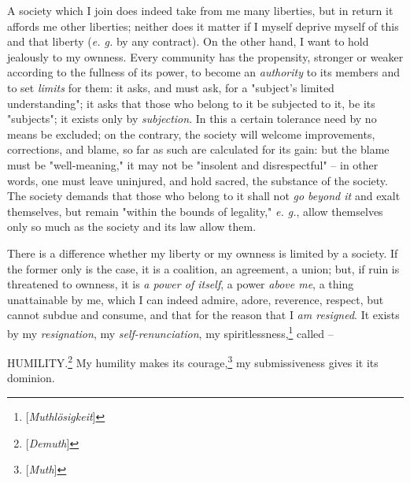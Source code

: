 \documentclass[a4paper]{book}
\begin{document}
A society which I join does indeed take from me many liberties, but in return 
it affords me other liberties; neither does it matter if I myself deprive 
myself of this and that liberty (\textit{e. g.} by any contract). On the other 
hand, I want to hold jealously to my ownness. Every community has the 
propensity, stronger or weaker according to the fullness of its power, to 
become an \textit{authority} to its members and to set \textit{limits} for 
them: it asks, and must ask, for a "{}subject's limited understanding"{}; it 
asks that those who belong to it be subjected to it, be its "{}subjects"{}; it 
exists only by \textit{subjection}. In this a certain tolerance need by no 
means be excluded; on the contrary, the society will welcome improvements, 
corrections, and blame, so far as such are calculated for its gain: but the 
blame must be "{}well-meaning,"{} it may not be "{}insolent and 
disrespectful"{} -- in other words, one must leave uninjured, and hold sacred, 
the substance of the society. The society demands that those who belong to it 
shall not \textit{go beyond it} and exalt themselves, but remain "{}within the 
bounds of legality,"{} \textit{e. g.}, allow themselves only so much as the 
society and its law allow them.

There is a difference whether my liberty or my ownness is limited by a 
society. If the former only is the case, it is a coalition, an agreement, a 
union; but, if ruin is threatened to ownness, it is \textit{a power of 
itself}, a power \textit{above me}, a thing unattainable by me, which I can 
indeed admire, adore, reverence, respect, but cannot subdue and consume, and 
that for the reason that I \textit{am resigned}. It exists by my 
\textit{resignation}, my \textit{self-renunciation}, my 
spiritlessness,\footnote{[\textit{Muthl\"osigkeit}]} called --

HUMILITY.\footnote{[\textit{Demuth}]} My humility makes its 
courage,\footnote{[\textit{Muth}]} my submissiveness gives it its dominion.
\end{document}

